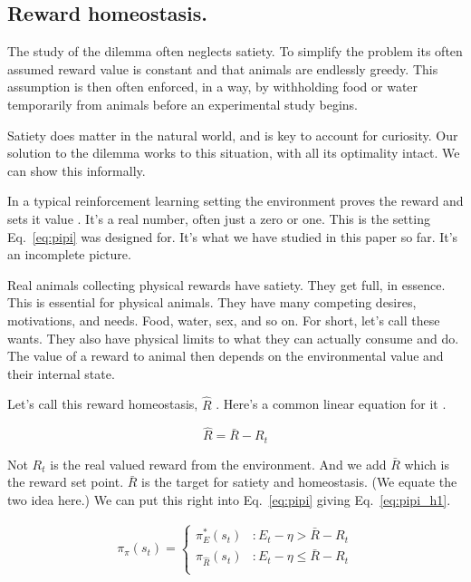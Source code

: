 \documentclass[9pt,lineno]{elife}
\begin{document}
\subsection*{Reward homeostasis.}
The study of the dilemma often neglects satiety. To simplify the problem its often assumed reward value is constant and that animals are endlessly greedy. This assumption is then often enforced, in a way, by withholding food or water temporarily from animals before an experimental study begins.

Satiety does matter in the natural world, and is key to account for curiosity. Our solution to the dilemma works to this situation, with all its optimality intact. We can show this informally.

In a typical reinforcement learning setting the environment proves the reward and sets it value \cite{Sutton2018}. It's a real number, often just a zero or one. This is the setting Eq.~\ref{eq:pipi} was designed for. It's what we have studied in this paper so far. It's an incomplete picture.

Real animals collecting physical rewards have satiety. They get full, in essence. This is essential for physical animals. They have many competing desires, motivations, and needs. Food, water, sex, and so on. For short, let's call these wants. They also have physical limits to what they can actually consume and do. The value of a reward to animal then depends on the environmental value and their internal state.

Let's call this reward homeostasis, $\hat R$ . Here's a common linear equation for it \cite{burKeramati2014}.

\begin{equation}
\label{eq:homeo}
    \hat R = \bar R - R_t
\end{equation}

Not $R_t$ is the real valued reward from the environment. And we add $\bar R$ which is the reward set point. $\bar R$ is the target for satiety and homeostasis. (We equate the two idea here.) We can put this right into Eq.~\ref{eq:pipi} giving Eq.~\ref{eq:pipi_h1}. 

\begin{equation}
    \label{eq:pipi_h1}
    \begin{split}
		\pi_{\pi}(s_t) = 
		\begin{cases}
			\pi^*_E(s_t) & : E_t - \eta > \bar R - R_t \\
			\pi_{\hat R}(s_t) & : E_t - \eta \le \bar R - R_t \\
		\end{cases}	
	\end{split}
\end{equation}
\end{document}
